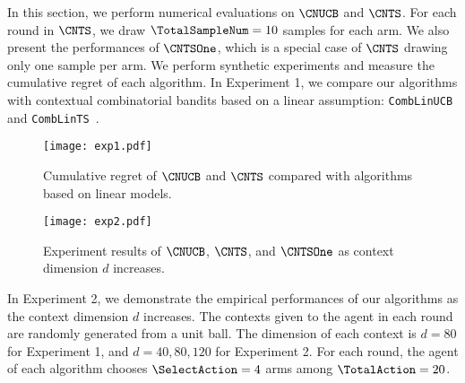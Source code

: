 \documentclass{article}
\theoremstyle{plain}
\begin{document}
In this section, we perform numerical evaluations on $\CNUCB$ and $\CNTS$.  
For each round in $\CNTS$, we draw $\TotalSampleNum=10$ samples for each arm.  
We also present the performances of $\CNTSOne$, which is a special case of $\CNTS$ drawing only one sample per arm.
We perform synthetic experiments and measure the cumulative regret of each algorithm.
In Experiment 1, we compare our algorithms with contextual combinatorial bandits based on a linear assumption: \texttt{CombLinUCB} and \texttt{CombLinTS}~\cite{wen2015efficient}.  
\begin{figure*}[t!]
\begin{center}
\centerline{\texttt{[image: exp1.pdf]}}
\caption{Cumulative regret of $\CNUCB$ and $\CNTS$ compared with algorithms based on linear models.}
\label{Fig1}
\end{center}
\end{figure*}

\begin{figure*}[ht]
\vskip -0.2in
\begin{center}
\centerline{\texttt{[image: exp2.pdf]}}
\caption{Experiment results of $\CNUCB$, $\CNTS$, and $\CNTSOne$ as context dimension $d$ increases.}
\label{Fig2}
\end{center}
\vskip -0.2in
\end{figure*}

In Experiment 2, we demonstrate the empirical performances of our algorithms as the context dimension $d$ increases.
The contexts given to the agent in each round are randomly generated from a unit ball.
The dimension of each context is $d=80$ for Experiment 1, and $d={40, 80, 120}$ for Experiment 2.
For each round, the agent of each algorithm chooses $\SelectAction=4$ arms among $\TotalAction=20$.
\end{document}
